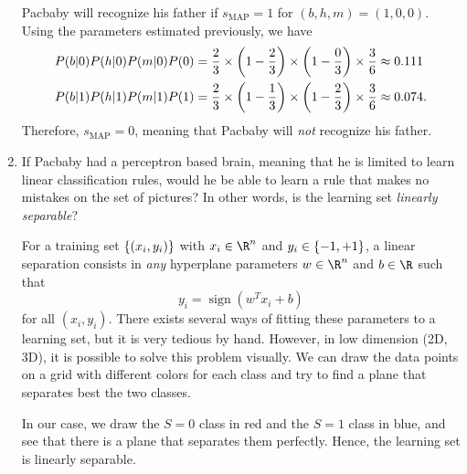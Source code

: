 \documentclass[11pt, a4paper]{article}
\begin{document}
\begin{enumerate}
    \begin{solution}
        Pacbaby will recognize his father if $s_{\text{MAP}} = 1$ for $(b, h, m) = (1, 0, 0)$. Using the parameters estimated previously, we have
        \begin{align*}
            P(b \knowing 0) P(h \knowing 0) P(m \knowing 0) P(0) & = \frac{2}{3} \times \rbk*{1 - \frac{2}{3}} \times \rbk*{1 - \frac{0}{3}} \times \frac{3}{6} \approx \num{0.111} \\
            P(b \knowing 1) P(h \knowing 1) P(m \knowing 1) P(1) & = \frac{2}{3} \times \rbk*{1 - \frac{1}{3}} \times \rbk*{1 - \frac{2}{3}} \times \frac{3}{6} \approx \num{0.074} .
        \end{align*}
        Therefore, $s_{\text{MAP}} = 0$, meaning that Pacbaby will \emph{not} recognize his father.
    \end{solution}
    
    \item If Pacbaby had a perceptron based brain, meaning that he is limited to learn linear classification rules, would he be able to learn a rule that makes no mistakes on the set of pictures? In other words, is the learning set \emph{linearly separable}?
    
    \begin{solution}
        For a training set $\cbk{(x_i, y_i)}$ with $x_i \in \R^n$ and $y_i \in \cbk{-1, +1}$, a linear separation consists in \emph{any} hyperplane parameters $w \in \R^n$ and $b \in \R$ such that
        \begin{equation*}
            y_i = \operatorname{sign}(w^T x_i + b)
        \end{equation*}
        for all $(x_i, y_i)$. There exists several ways of fitting these parameters to a learning set, but it is very tedious by hand. However, in low dimension (2D, 3D), it is possible to solve this problem visually. We can draw the data points on a grid with different colors for each class and try to find a plane that separates best the two classes.
        
        In our case, we draw the $S = 0$ class in red and the $S = 1$ class in blue, and see that there is a plane that separates them perfectly. Hence, the learning set is linearly separable.
        
        \begin{center}
        

\end{center}
\end{solution}
\end{enumerate}
\end{document}
